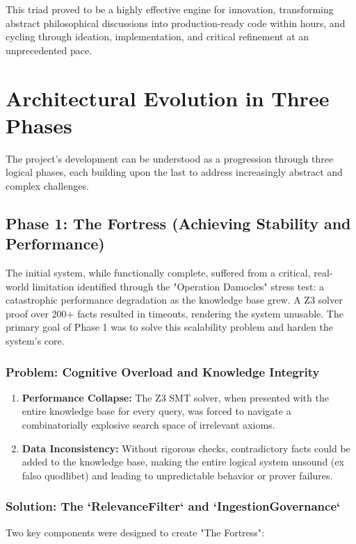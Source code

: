 \documentclass[11pt, a4paper]{article}
\begin{document}
This triad proved to be a highly effective engine for innovation, transforming abstract philosophical discussions into production-ready code within hours, and cycling through ideation, implementation, and critical refinement at an unprecedented pace.

\section{Architectural Evolution in Three Phases}
\label{sec:evolution}

The project's development can be understood as a progression through three logical phases, each building upon the last to address increasingly abstract and complex challenges.

\subsection{Phase 1: The Fortress (Achieving Stability and Performance)}
\label{subsec:fortress}

The initial system, while functionally complete, suffered from a critical, real-world limitation identified through the "Operation Damocles" stress test: a catastrophic performance degradation as the knowledge base grew. A Z3 solver proof over 200+ facts resulted in timeouts, rendering the system unusable. The primary goal of Phase 1 was to solve this scalability problem and harden the system's core.

\subsubsection{Problem: Cognitive Overload and Knowledge Integrity}
\begin{enumerate}
    \item \textbf{Performance Collapse:} The Z3 SMT solver, when presented with the entire knowledge base for every query, was forced to navigate a combinatorially explosive search space of irrelevant axioms.
    \item \textbf{Data Inconsistency:} Without rigorous checks, contradictory facts could be added to the knowledge base, making the entire logical system unsound (ex falso quodlibet) and leading to unpredictable behavior or prover failures.
\end{enumerate}

\subsubsection{Solution: The `RelevanceFilter` and `IngestionGovernance`}
Two key components were designed to create "The Fortress":
\end{document}
